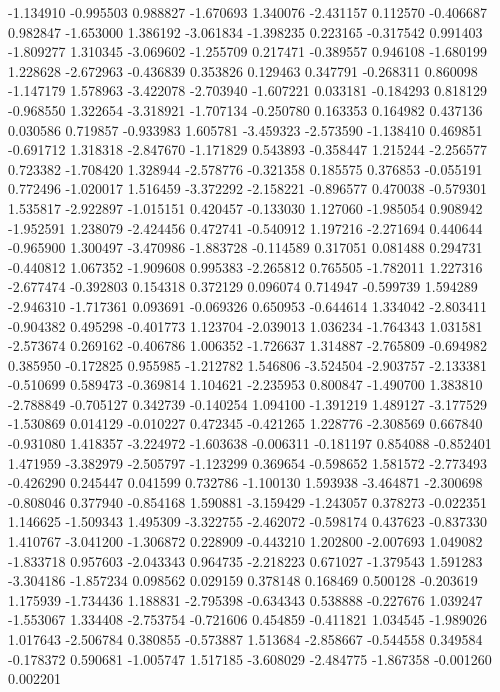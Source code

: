 -1.134910
-0.995503
0.988827
-1.670693
1.340076
-2.431157
0.112570
-0.406687
0.982847
-1.653000
1.386192
-3.061834
-1.398235
0.223165
-0.317542
0.991403
-1.809277
1.310345
-3.069602
-1.255709
0.217471
-0.389557
0.946108
-1.680199
1.228628
-2.672963
-0.436839
0.353826
0.129463
0.347791
-0.268311
0.860098
-1.147179
1.578963
-3.422078
-2.703940
-1.607221
0.033181
-0.184293
0.818129
-0.968550
1.322654
-3.318921
-1.707134
-0.250780
0.163353
0.164982
0.437136
0.030586
0.719857
-0.933983
1.605781
-3.459323
-2.573590
-1.138410
0.469851
-0.691712
1.318318
-2.847670
-1.171829
0.543893
-0.358447
1.215244
-2.256577
0.723382
-1.708420
1.328944
-2.578776
-0.321358
0.185575
0.376853
-0.055191
0.772496
-1.020017
1.516459
-3.372292
-2.158221
-0.896577
0.470038
-0.579301
1.535817
-2.922897
-1.015151
0.420457
-0.133030
1.127060
-1.985054
0.908942
-1.952591
1.238079
-2.424456
0.472741
-0.540912
1.197216
-2.271694
0.440644
-0.965900
1.300497
-3.470986
-1.883728
-0.114589
0.317051
0.081488
0.294731
-0.440812
1.067352
-1.909608
0.995383
-2.265812
0.765505
-1.782011
1.227316
-2.677474
-0.392803
0.154318
0.372129
0.096074
0.714947
-0.599739
1.594289
-2.946310
-1.717361
0.093691
-0.069326
0.650953
-0.644614
1.334042
-2.803411
-0.904382
0.495298
-0.401773
1.123704
-2.039013
1.036234
-1.764343
1.031581
-2.573674
0.269162
-0.406786
1.006352
-1.726637
1.314887
-2.765809
-0.694982
0.385950
-0.172825
0.955985
-1.212782
1.546806
-3.524504
-2.903757
-2.133381
-0.510699
0.589473
-0.369814
1.104621
-2.235953
0.800847
-1.490700
1.383810
-2.788849
-0.705127
0.342739
-0.140254
1.094100
-1.391219
1.489127
-3.177529
-1.530869
0.014129
-0.010227
0.472345
-0.421265
1.228776
-2.308569
0.667840
-0.931080
1.418357
-3.224972
-1.603638
-0.006311
-0.181197
0.854088
-0.852401
1.471959
-3.382979
-2.505797
-1.123299
0.369654
-0.598652
1.581572
-2.773493
-0.426290
0.245447
0.041599
0.732786
-1.100130
1.593938
-3.464871
-2.300698
-0.808046
0.377940
-0.854168
1.590881
-3.159429
-1.243057
0.378273
-0.022351
1.146625
-1.509343
1.495309
-3.322755
-2.462072
-0.598174
0.437623
-0.837330
1.410767
-3.041200
-1.306872
0.228909
-0.443210
1.202800
-2.007693
1.049082
-1.833718
0.957603
-2.043343
0.964735
-2.218223
0.671027
-1.379543
1.591283
-3.304186
-1.857234
0.098562
0.029159
0.378148
0.168469
0.500128
-0.203619
1.175939
-1.734436
1.188831
-2.795398
-0.634343
0.538888
-0.227676
1.039247
-1.553067
1.334408
-2.753754
-0.721606
0.454859
-0.411821
1.034545
-1.989026
1.017643
-2.506784
0.380855
-0.573887
1.513684
-2.858667
-0.544558
0.349584
-0.178372
0.590681
-1.005747
1.517185
-3.608029
-2.484775
-1.867358
-0.001260
0.002201

